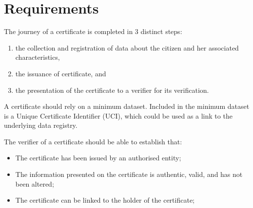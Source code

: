 \documentclass[a4paper,12pt,english,openany]{sphinxmanual}
\begin{document}
\section{Requirements}
\label{\detokenize{privacycred:requirements}}
\sphinxAtStartPar
The journey of a certificate is completed in 3 distinct steps:
\begin{enumerate}
%
\item {} 
\sphinxAtStartPar
the collection and registration of data about the citizen and her associated characteristics,

\item {} 
\sphinxAtStartPar
the issuance of certificate, and

\item {} 
\sphinxAtStartPar
the presentation of the certificate to a verifier for its verification.

\end{enumerate}

\sphinxAtStartPar
A certificate should rely on a minimum dataset. Included in the minimum dataset is a Unique Certificate Identifier (UCI), which could be used as a link to the underlying data registry.

\sphinxAtStartPar
The verifier of a certificate should be able to establish that:
\begin{itemize}
\item {} 
\sphinxAtStartPar
The certificate has been issued by an authorised entity;

\item {} 
\sphinxAtStartPar
The information presented on the certificate is authentic, valid, and has not been altered;

\item {} 
\sphinxAtStartPar
The certificate can be linked to the holder of the certificate;

\end{itemize}
\end{document}
